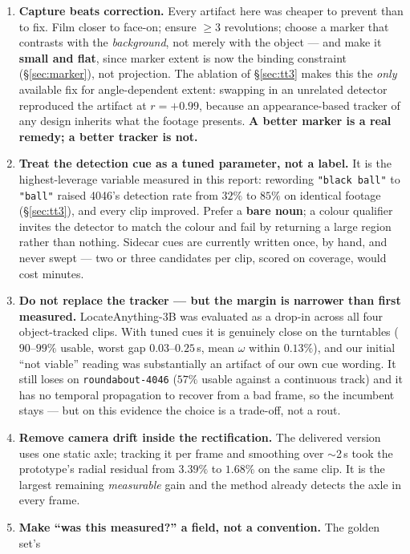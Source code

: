 \documentclass[11pt,a4paper]{article}
\begin{document}
\begin{enumerate}
  \item \textbf{Capture beats correction.} Every artifact here was cheaper to prevent than to
  fix. Film closer to face-on; ensure $\ge 3$ revolutions; choose a marker that contrasts with
  the \emph{background}, not merely with the object --- and make it \textbf{small and flat}, since
  marker extent is now the binding constraint (\S\ref{sec:marker}), not projection. The ablation of
  \S\ref{sec:tt3} makes this the \emph{only} available fix for angle-dependent extent: swapping in
  an unrelated detector reproduced the artifact at $r={+}0.99$, because an appearance-based tracker
  of any design inherits what the footage presents. \textbf{A better marker is a real remedy; a
  better tracker is not.}
  \item \textbf{Treat the detection cue as a tuned parameter, not a label.} It is the
  highest-leverage variable measured in this report: rewording \texttt{"black ball"} to
  \texttt{"ball"} raised 4046's detection rate from $32\%$ to $85\%$ on identical footage
  (\S\ref{sec:tt3}), and every clip improved. Prefer a \textbf{bare noun}; a colour qualifier
  invites the detector to match the colour and fail by returning a large region rather than nothing.
  Sidecar cues are currently written once, by hand, and never swept --- two or three candidates per
  clip, scored on coverage, would cost minutes.
  \item \textbf{Do not replace the tracker --- but the margin is narrower than first measured.}
  LocateAnything-3B was evaluated as a drop-in across all four object-tracked clips. With tuned
  cues it is genuinely close on the turntables ($90$--$99\%$ usable, worst gap $0.03$--$0.25$\,s,
  mean $\omega$ within $0.13\%$), and our initial ``not viable'' reading was substantially an
  artifact of our own cue wording. It still loses on \texttt{roundabout-4046} ($57\%$ usable against
  a continuous track) and it has no temporal propagation to recover from a bad frame, so the
  incumbent stays --- but on this evidence the choice is a trade-off, not a rout.
  \item \textbf{Remove camera drift inside the rectification.} The delivered version uses one
  static axle; tracking it per frame and smoothing over $\sim$2\,s took the prototype's radial
  residual from $3.39\%$ to $1.68\%$ on the same clip. It is the largest remaining
  \emph{measurable} gain and the method already detects the axle in every frame.
  \item \textbf{Make ``was this measured?'' a field, not a convention.} The golden set's

\end{enumerate}
\end{document}
